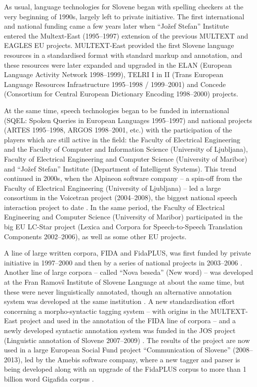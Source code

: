 \begin{multicols}{2}

As usual, language technologies for Slovene began with spelling checkers at the very beginning of 1990s, largely left to private initiative. The first international and national funding came a few years later when “Jožef Stefan” Institute entered the Multext-East (1995--1997) extension of the previous MULTEXT and EAGLES EU projects. MULTEXT-East provided the first Slovene language resources in a standardised format with standard markup and annotation, and these resources were later expanded and upgraded in the ELAN (European Language Activity Network 1998--1999), TELRI I in II (Trans European Language Resources Infrastructure 1995--1998 / 1999--2001) and Concede (Consortium for Central European Dictionary Encoding 1998--2000) projects.

At the same time, speech technologies began to be funded in international (SQEL: Spoken Queries in European Languages 1995--1997) and national projects (ARTES 1995--1998, ARGOS 1998--2001, etc.) with the participation of the players which are still active in the field: the Faculty of Electrical Engineering  and the Faculty of Computer and Information Science (University of Ljubljana), Faculty of Electrical Engineering and Computer Science (University of Maribor) and  “Jožef Stefan” Institute (Department of Intelligent Systems). This trend continued in 2000s, when the Alpineon software company – a spin-off from the Faculty of Electrical Engineering (University of Ljubljana) – led a large consortium in the Voicetran project (2004--2008), the biggest national speech interaction project to date \cite{Alp4}. In the same period, the Faculty of Electrical Engineering and Computer Science (University of Maribor) participated in the big EU LC-Star project (Lexica and Corpora for Speech-to-Speech Translation Components 2002--2006), as well as some other EU projects. 

A line of large written corpora, FIDA and FidaPLUS, was first funded by private initiative in 1997--2000 and then by a series of national projects in 2003--2006 \cite{Fida1}. Another line of large corpora – called ``Nova beseda'' (New word) – was developed at the Fran Ramovš Institute of Slovene Language at about the same time, but these were never linguistically annotated, though an alternative annotation system was developed at the same institution \cite{NB1}.  A new standardisation effort concerning a morpho-syntactic tagging system – with origins in the MULTEXT-East project and used in the annotation of the FIDA line of corpora – and a newly developed syntactic annotation system was funded in the JOS project (Linguistic annotation of Slovene 2007--2009) \cite{JOS1}. The results of the project are now used in a large European Social Fund project ``Communication of Slovene'' (2008--2013), led by the Amebis software company, where a new tagger and parser is being developed along with an upgrade of the FidaPLUS corpus to more than 1 billion word Gigafida corpus \cite{Slo1}. 


\end{multicols}
